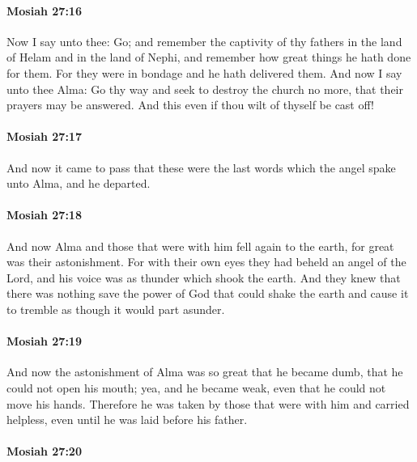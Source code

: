 		\paragraph{Mosiah 27:16} %
			\label{MOSIAH-27-16}

			Now I say unto thee: Go;
			and remember the captivity of thy fathers
			in the land of Helam and in the land of Nephi,
			and remember how great things he hath done for them.
			For they were in bondage and he hath delivered them.
			And now I say unto thee Alma:
			Go thy way and seek to destroy the church no more,
			that their prayers may be answered.
			And this even if thou wilt of thyself be cast off!

		\paragraph{Mosiah 27:17} %
			\label{MOSIAH-27-17}

			And now it came to pass that
			these were the last words which the angel spake unto Alma,
			and he departed.

		\paragraph{Mosiah 27:18} %
			\label{MOSIAH-27-18}

			And now Alma and those that were with him fell again to the earth,
			for great was their astonishment.
			For with their own eyes they had beheld an angel of the Lord,
			and his voice was as thunder which shook the earth.
			And they knew that there was nothing save the power of God
			that could shake the earth and cause it to tremble
			as though it would part asunder.

		\paragraph{Mosiah 27:19} %
			\label{MOSIAH-27-19}

			And now the astonishment of Alma was so great
			that he became dumb,
			that he could not open his mouth;
			yea, and he became weak,
			even that he could not move his hands.
			Therefore he was taken by those that were with him and carried helpless,
			even until he was laid before his father.

		\paragraph{Mosiah 27:20} %
			\label{MOSIAH-27-20}

